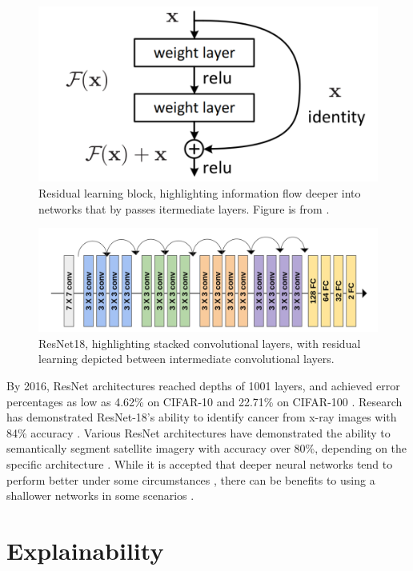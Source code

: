 \begin{figure}
    \centering
    \includegraphics[width=0.5\linewidth]{Figures/residual_learning_block.png}
    \caption{Residual learning block, highlighting information flow deeper into networks that by passes itermediate layers.  Figure is from \citep{he2016deep}.}
    \label{fig:residual_block}
\end{figure}


\begin{figure}
    \centering
    \includegraphics[width=1\linewidth]{Figures/resnet18_architecture.png}
    \caption{ResNet18, highlighting stacked convolutional layers, with residual learning depicted between intermediate convolutional layers.}
    \label{fig:resnet18_ch2}
\end{figure}

By 2016, ResNet architectures reached depths of 1001 layers, and achieved error percentages as low as 4.62\% on CIFAR-10 and 22.71\% on CIFAR-100 \citep{xie2017aggregated}.  Research has demonstrated ResNet-18's ability to identify cancer from x-ray images with 84\% accuracy \citep{khan2018evaluating}.  Various ResNet architectures have demonstrated the ability to semantically segment satellite imagery with accuracy over 80\%, depending on the specific architecture \citep{heryadi2020effect}.  While it is accepted that deeper neural networks tend to perform better under some circumstances \citep{he2016deep, lodhi2019multipath, sinha2020d2rl}, there can be benefits to using a shallower networks in some scenarios \citep{sekiyama2018profile,gorban2020deep}. 


\section{Explainability}

